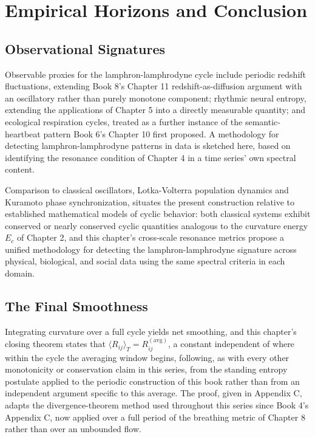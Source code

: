 \part{Empirical Horizons and Conclusion}

\chapter{Observational Signatures}

Observable proxies for the lamphron-lamphrodyne cycle include periodic redshift fluctuations, extending Book 8's Chapter 11 redshift-as-diffusion argument with an oscillatory rather than purely monotone component; rhythmic neural entropy, extending the applications of Chapter 5 into a directly measurable quantity; and ecological respiration cycles, treated as a further instance of the semantic-heartbeat pattern Book 6's Chapter 10 first proposed. A methodology for detecting lamphron-lamphrodyne patterns in data is sketched here, based on identifying the resonance condition of Chapter 4 in a time series' own spectral content.

Comparison to classical oscillators, Lotka-Volterra population dynamics and Kuramoto phase synchronization, situates the present construction relative to established mathematical models of cyclic behavior: both classical systems exhibit conserved or nearly conserved cyclic quantities analogous to the curvature energy $E_c$ of Chapter 2, and this chapter's cross-scale resonance metrics propose a unified methodology for detecting the lamphron-lamphrodyne signature across physical, biological, and social data using the same spectral criteria in each domain.

\chapter{The Final Smoothness}

Integrating curvature over a full cycle yields net smoothing, and this chapter's closing theorem states that $\langle R_{ij} \rangle_T = R_{ij}^{(\text{avg})}$, a constant independent of where within the cycle the averaging window begins, following, as with every other monotonicity or conservation claim in this series, from the standing entropy postulate applied to the periodic construction of this book rather than from an independent argument specific to this average. The proof, given in Appendix C, adapts the divergence-theorem method used throughout this series since Book 4's Appendix C, now applied over a full period of the breathing metric of Chapter 8 rather than over an unbounded flow.


